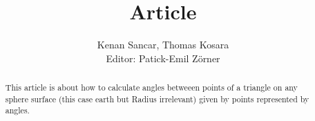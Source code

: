 \documentclass[12pt, a4paper, twoside, titlepage]{article}
\title{Article}
\author{Kenan Sancar, Thomas Kosara\\Editor: Patick-Emil Zörner}
\begin{document}
\maketitle
\begin{abstract}
    This article is about how to calculate angles betweeen points of a triangle on any sphere surface (this case earth but Radius irrelevant) given by points represented by angles.
\end{abstract}

\end{document}
